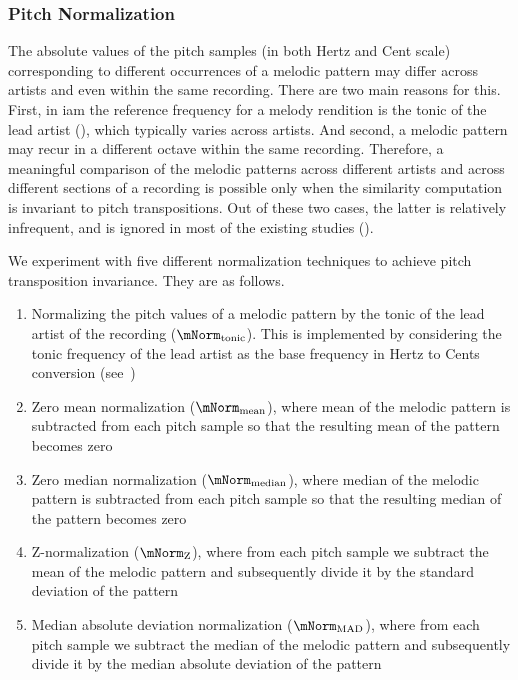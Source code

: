 \subsubsection{Pitch Normalization}
\label{sec:patterns_melodic_similarity_transposition_invariance}

The absolute values of the pitch samples (in both Hertz and Cent scale) corresponding to different occurrences of a melodic pattern may differ across artists and even within the same recording. There are two main reasons for this. First, in \gls{iam} the reference frequency for a melody rendition is the tonic of the lead artist (), which typically varies across artists. And second, a melodic pattern may recur in a different octave within the same recording. Therefore, a meaningful comparison of the melodic patterns across different artists and across different sections of a recording is possible only when the similarity computation is invariant to pitch transpositions. Out of these two cases, the latter is relatively infrequent, and is ignored in most of the existing studies ().

We experiment with five different normalization techniques to achieve pitch transposition invariance. They are as follows.

\begin{enumerate}
	\item Normalizing the pitch values of a melodic pattern by the tonic of the lead artist of the recording ($\mNorm_{\mathrm{tonic}}$). This is implemented by considering the tonic frequency of the lead artist as the base frequency in Hertz to Cents conversion (see~)

	\item Zero mean normalization ($\mNorm_{\mathrm{mean}}$), where mean of the melodic pattern is subtracted from each pitch sample so that the resulting mean of the pattern becomes zero
	
	\item Zero median normalization ($\mNorm_{\mathrm{median}}$), where median of the melodic pattern is subtracted from each pitch sample so that the resulting median of the pattern becomes zero
	\item Z-normalization ($\mNorm_{\mathrm{Z}}$), where from each pitch sample we subtract the mean of the melodic pattern and subsequently divide it by the standard deviation of the pattern
	\item Median absolute deviation normalization ($\mNorm_{\mathrm{MAD}}$), where from each pitch sample we subtract the median of the melodic pattern and subsequently divide it by the median absolute deviation of the pattern
\end{enumerate}

